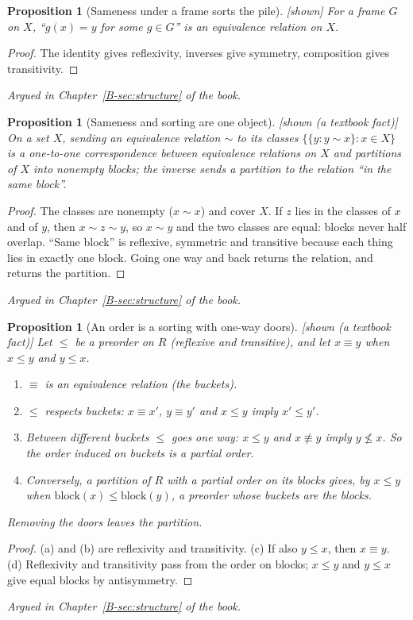 \documentclass[11pt, a4paper]{article}
\theoremstyle{plain}
\newtheorem{proposition}[theorem]{Proposition}
\theoremstyle{definition}
\theoremstyle{remark}
\newcommand{\argued}[1]{\par\noindent\textit{Argued in Chapter~\ref{B-#1} of the book.}\par}
\newcommand{\kind}[1]{\textup{[#1]}}
\begin{document}
\begin{proposition}[Sameness under a frame sorts the pile]\label{spec:orbits} \kind{shown}
For a frame $G$ on $X$, ``$g(x)=y$ for some $g\in G$'' is an equivalence relation on $X$.
\end{proposition}
\begin{proof}
The identity gives reflexivity, inverses give symmetry, composition gives transitivity.
\end{proof}
\argued{sec:structure}

\begin{proposition}[Sameness and sorting are one object]\label{spec:halmos} \kind{shown (a textbook fact)}
On a set $X$, sending an equivalence relation $\sim$ to its classes $\{\{y:y\sim x\}:x\in X\}$ is a
one-to-one correspondence between equivalence relations on $X$ and partitions of $X$ into nonempty blocks;
the inverse sends a partition to the relation ``in the same block''.
\end{proposition}
\begin{proof}
The classes are nonempty ($x\sim x$) and cover $X$. If $z$ lies in the classes of $x$ and of $y$, then
$x\sim z\sim y$, so $x\sim y$ and the two classes are equal: blocks never half overlap. ``Same block'' is
reflexive, symmetric and transitive because each thing lies in exactly one block. Going one way and back
returns the relation, and returns the partition.
\end{proof}
\argued{sec:structure}

\begin{proposition}[An order is a sorting with one-way doors]\label{spec:order-doors} \kind{shown (a textbook fact)}
Let $\le$ be a preorder on $R$ (reflexive and transitive), and let $x\equiv y$ when $x\le y$ and $y\le x$.
\begin{enumerate}[label=(\alph*)]
\item $\equiv$ is an equivalence relation (the buckets).
\item $\le$ respects buckets: $x\equiv x'$, $y\equiv y'$ and $x\le y$ imply $x'\le y'$.
\item Between different buckets $\le$ goes one way: $x\le y$ and $x\not\equiv y$ imply $y\not\le x$. So the
order induced on buckets is a partial order.
\item Conversely, a partition of $R$ with a partial order on its blocks gives, by $x\le y$ when
$\mathrm{block}(x)\le\mathrm{block}(y)$, a preorder whose buckets are the blocks.
\end{enumerate}
Removing the doors leaves the partition.
\end{proposition}
\begin{proof}
(a) and (b) are reflexivity and transitivity. (c) If also $y\le x$, then $x\equiv y$. (d) Reflexivity and
transitivity pass from the order on blocks; $x\le y$ and $y\le x$ give equal blocks by antisymmetry.
\end{proof}
\argued{sec:structure}
\end{document}
